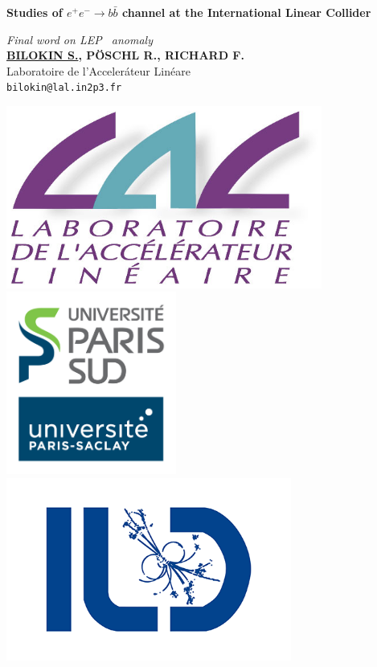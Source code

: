 \documentclass[a0,portrait]{a0poster}
\begin{document}
\BgThispage

\begin{minipage}[b]{1.\linewidth}
\veryHuge \color{NavyBlue} \textbf{Studies of $e^+e^-\to b\bar{b}$ channel at the International Linear Collider} \color{Black} %
\end{minipage}
\begin{minipage}[b]{0.5\linewidth}
\Huge\textit{Final word on LEP \afb\ anomaly}\\[1cm]
\huge \textbf{\underline{BILOKIN S.}, P\"OSCHL R., RICHARD F.}\\[0.5cm] %
\huge Laboratoire de l'Acceler\'ateur Lin\'eare\\[0.4cm] %
\Large \texttt{bilokin@lal.in2p3.fr}
\end{minipage}
\begin{minipage}[b]{0.5\linewidth}
	\centering
\includegraphics[height=6cm]{figures/LAL.jpg}
\includegraphics[height=6cm]{figures/UPSUD.jpg}
\includegraphics[height=6cm]{figures/logo-ild.png}\\
\end{minipage}

\vspace{1cm} %


\begin{multicols}{2} 

\end{multicols}
\end{document}
